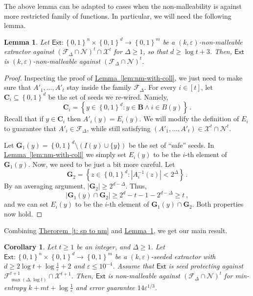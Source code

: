 \documentclass[11pt]{article}
\numberwithin{equation}{section}
\newtheorem{lemma}[theorem]{Lemma}
\newtheorem{corollary}[theorem]{Corollary}
\theoremstyle{definition}
\theoremstyle{plain}
\newcommand{\expref}[2]{\hyperref[#2]{#1~\ref{#2}}}
\newcommand{\ext}{\mathsf{Ext}}
\newcommand{\eps}{\varepsilon}
\newcommand{\nc}{\mathcal{X}}
\newcommand{\set}[1]{\left\{{#1}\right\}}
\newcommand{\B}{\set{0,1}}
\newcommand{\advfampart}{\mathcal{F}}
\newcommand{\nofp}{\mathcal{N}}
\begin{document}
%
%
%

The above lemma can be adapted to cases when the non-malleability is against
more restricted family of functions. In particular, we will need the following lemma.
\begin{lemma}\label{lem:nm-with-coll22} 
Let $\ext \colon \B^{n} \times \B^{d} \rightarrow \B^{m}$ be a $(k,\eps)$-non-malleable
extractor against $\left(\advfampart_{\Delta} \cap \nofp\right)^t \cap \nc^t$ for $\Delta  \ge 1$, so that $d \ge \log {t} + 3$. Then, $\ext$ is $(k,\eps)$-non-malleable
against $\left(\advfampart_{\Delta} \cap \nofp\right)^t$.
\end{lemma}
\begin{proof}
Inspecting the proof of \expref{Lemma}{lem:nm-with-coll}, we just need to make sure that
$A'_{1},\ldots,A'_{t}$ stay inside the family $\mathcal{F}_{\Delta}$. For every $i \in [t]$, let
$\mathbf{C}_i \subseteq \B^d$ be the set of seeds we re-wired. Namely,
\[
\mathbf{C}_i = \set{y \in \B^d : y \in \mathbf{B} \wedge i \in B(y)}\,.
\]
Recall that if $y \in \mathbf{C}_i$ then $A'_{i}(y) = E_{i}(y)$. We will modify the definition of 
$E_{i}$ to guarantee that $A'_i \in \mathcal{F}_{\Delta}$, while still satisfying
$(A'_1,\ldots,A'_t) \in \mathcal{X}^t \cap \nofp^t$.%

Let $\mathbf{G}_1(y) = \B^{d} \setminus (I(y) \cup \{y\})$ be the set of ``safe'' seeds. In \expref{Lemma}{lem:nm-with-coll}
we simply set $E_{i}(y)$ to be the $i$-th element of $\mathbf{G}_1(y)$. Now, we need to be just a bit
more careful. Let
\[
\mathbf{G}_2 = \set{z \in \B^d: \left| A_{i}^{-1}(z) \right| < 2^{\Delta}}\,.
\]
By an averaging argument, $|\mathbf{G}_2| \ge 2^{d-\Delta}$. Thus, 
\[
\left|\mathbf{G}_1(y) \cap \mathbf{G}_2\right| \ge 2^d - t - 1 - 2^{d-\Delta} \ge t\,,
\]
and we can set $E_{i}(y)$ to be the $i$-th element of $\mathbf{G}_1(y) \cap \mathbf{G}_2$.
Both properties now hold.
\end{proof}
%
%
%
%
%
%
%
%
%
%

Combining \expref{Therorem}{t: sp to nm} and \expref{Lemma}{lem:nm-with-coll22}, we get our main result.

\begin{corollary}\label{main:sec2}
Let $t \ge 1$ be an integer, and $\Delta \ge 1$.
Let $\ext\colon\B^{n}\times\B^{d}\rightarrow\B^m$ be a $(k,\eps)$-seeded extractor with $d \ge 2\log{t} + \log\frac1{\eps} + 2$ and $\eps \leq 10^{-4}$. Assume that $\ext$ is seed protecting against $\advfampart^{t+1}_{\max(\Delta, \log t)} \cap \nc^{t+1}$. Then, $\ext$ is non-malleable against $\left(\advfampart_{\Delta} \cap \nofp\right)^t$  for min-entropy $k+mt+\log\frac1{\eps}$ and error guarantee $14 \eps^{1/3}$.
\end{corollary}
\end{document}
